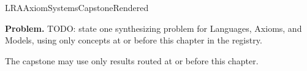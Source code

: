 \ifcsname LRAAxiomSystemsCapstoneRendered\endcsname
\else
\expandafter\gdef\csname LRAAxiomSystemsCapstoneRendered\endcsname{}

\newpage
{}
\label{cap:axiom-systems}

\begin{tcolorbox}[
  colback=gray!6,
  colframe=gray!40,
  arc=2pt,
  left=8pt, right=8pt, top=6pt, bottom=6pt,
  title={\small\textbf{Capstone Problem}},
  fonttitle=\small\bfseries
]
\textbf{Problem.}
TODO: state one synthesizing problem for Languages, Axioms, and Models, using only concepts at or
before this chapter in the registry.
\end{tcolorbox}

\begin{remark*}
The capstone may use only results routed at or before this chapter.
\end{remark*}

\clearpage
\fi

